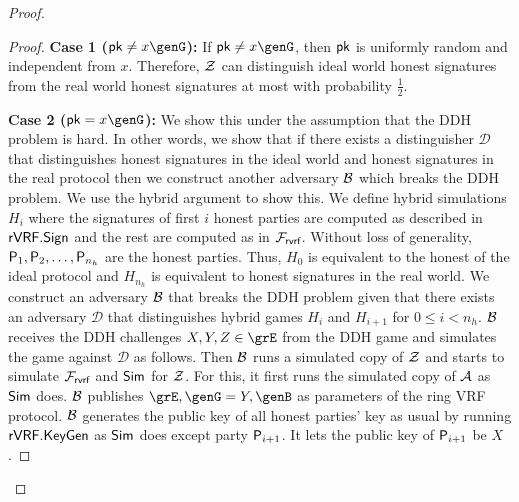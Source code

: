 \begin{proof}
\begin{proof}
			\textbf{Case 1 ($ \pk \neq x \genG$):} If  $ \pk \neq x \genG$, then  $ \mathsf{pk} $ is uniformly random and independent from $ x $. Therefore, $ \mathcal{Z} $ can distinguish ideal world honest signatures from the real world honest signatures at most with probability $ \frac{1}{2} $.
			
			\textbf{Case 2 ($ \pk = x \genG$):} We  show this under the assumption that the DDH problem  is hard.  In other words, we show that if there exists a distinguisher $ \mathcal{D} $ that distinguishes honest signatures in the ideal world and honest signatures in the real protocol then we construct another adversary $ \mathcal{B} $ which breaks the DDH problem. 
			We use the hybrid argument to show this.
			We define hybrid simulations $ H_{i} $ where  the signatures of first $ i $ honest parties are computed as described in $ {\mathsf{rVRF}}.{\mathsf{Sign}} $ and the rest are computed as in $ \mathcal{F}_{\textsf{rvrf}} $. Without loss of generality, $ \mathsf{P}_1, \mathsf{P}_2, \ldots, \mathsf{P}_{n_h} $ are the honest parties. Thus, $ H_0 $ is equivalent to the honest of the ideal protocol  and $ H_{n_h}  $ is equivalent to  honest signatures in the real world.  We construct an adversary $ \mathcal{B} $ that breaks the DDH problem given that there exists an adversary $ \mathcal{D} $ that distinguishes hybrid games $ H_i $ and $ H_{i + 1} $ for $ 0 \leq i < n_h $. $\mathcal{B} $ receives the DDH challenges $ X,Y, Z \in \GG $ from the DDH game and simulates the game against $ \mathcal{D} $ as follows. 
			Then $ \mathcal{B} $ runs a simulated copy of $ \mathcal{Z} $ and starts to simulate $ \mathcal{F}_{\textsf{rvrf}} $ and $ \mathsf{Sim} $ for $ \mathcal{Z} $. For this, it first runs the simulated copy of $ \mathcal{A} $ as $ \mathsf{Sim} $ does. $  \mathcal{B} $ publishes $ \GG, \genG = Y, \genB $ as parameters of the ring VRF protocol. $\mathcal{B} $ generates the public key of all  honest parties' key as usual by running $ {\mathsf{rVRF}}.{\mathsf{KeyGen}}$ as $ \mathsf{Sim} $ does except party $ \mathsf{P}_{i+1} $. It lets the public key of $ \mathsf{P}_{i + 1} $ be $ X $.
		
%				
%				
		

\end{proof}
\end{proof}
